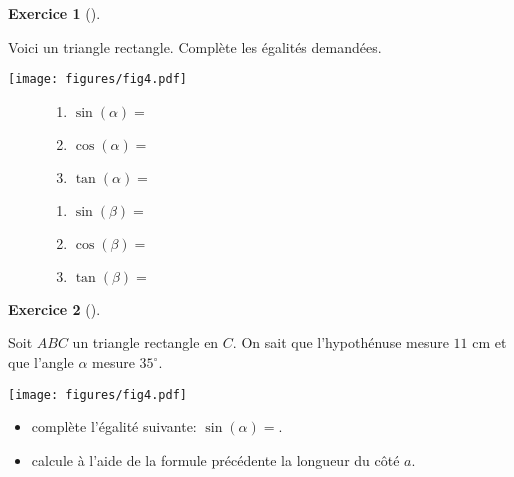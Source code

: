 \documentclass[
  a4paper,
  DIV=11,
  numbers=noendperiod,
  oneside]{scrreprt}
\providecommand{\tightlist}{%
  \setlength{\itemsep}{0pt}\setlength{\parskip}{0pt}}\usepackage{longtable,booktabs,array}
\theoremstyle{definition}
\theoremstyle{definition}
\newtheorem{exercise}{Exercice}[chapter]
\theoremstyle{plain}
\theoremstyle{definition}
\theoremstyle{remark}
\begin{document}
\begin{exercise}[]\protect\hypertarget{exr-trig}{}\label{exr-trig}

Voici un triangle rectangle. Complète les égalités demandées.

\begin{center}
\texttt{[image: figures/fig4.pdf]}
\end{center}

\begin{figure}

\begin{minipage}{0.50\linewidth}

\begin{enumerate}
\def\labelenumi{\roman{enumi})}
\item
  \(\sin(\alpha)=\)\dotfill
\item
  \(\cos(\alpha)=\)\dotfill
\item
  \(\tan(\alpha)=\)\dotfill
\end{enumerate}

\end{minipage}%
%
\begin{minipage}{0.50\linewidth}

\begin{enumerate}
\def\labelenumi{\roman{enumi})}
\item
  \(\sin(\beta)=\)\dotfill
\item
  \(\cos(\beta)=\)\dotfill
\item
  \(\tan(\beta)=\)\dotfill
\end{enumerate}

\end{minipage}%

\end{figure}%

\end{exercise}

\begin{exercise}[]\protect\hypertarget{exr-hauteur}{}\label{exr-hauteur}

Soit \(ABC\) un triangle rectangle en \(C\). On sait que l'hypothénuse
mesure \(11\) cm et que l'angle \(\alpha\) mesure \(35^\circ\).

\begin{center}
\texttt{[image: figures/fig4.pdf]}
\end{center}

\begin{itemize}
\tightlist
\item
  complète l'égalité suivante: \(\sin(\alpha)=\)\dotfill.
\item
  calcule à l'aide de la formule précédente la longueur du côté \(a\).
\end{itemize}

\end{exercise}
\end{document}
